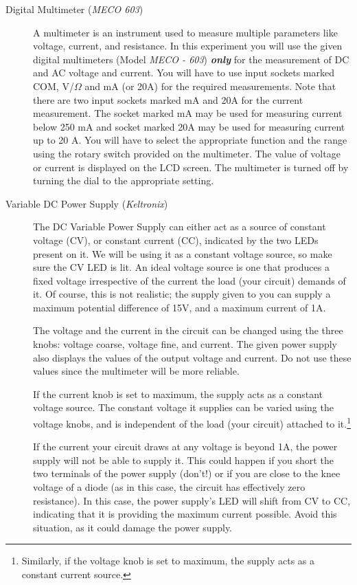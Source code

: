 \begin{description}
\item[Digital Multimeter (\textit{MECO 603})]

A multimeter is an instrument used to measure multiple parameters like voltage, current, and resistance. In this experiment you will use the given digital multimeters (Model \textit{MECO - 603}) \textbf{\textit{only}} for the measurement of DC and AC voltage and current. You will have to use input sockets marked COM, V/$\Omega$ and mA (or 20A) for the required measurements. Note that there are two input sockets marked mA and 20A for the current measurement. The socket marked mA may be used for measuring current below 250 mA and socket marked 20A may be used for measuring current up to 20 A. You will have to select the appropriate function and the range using the rotary switch provided on the multimeter. The value of voltage or current is displayed on the LCD screen. The multimeter is turned off by turning the dial to the appropriate setting.

\item[Variable DC Power Supply (\textit{Keltronix})]

The DC Variable Power Supply can either act as a source of constant voltage (CV), or constant current (CC), indicated by the two LEDs present on it. We will be using it as a constant voltage source, so make sure the CV LED is lit. An ideal voltage source is one that produces a fixed voltage irrespective of the current the load (your circuit) demands of it. Of course, this is not realistic; the supply given to you can supply a maximum potential difference of 15V, and a maximum current of 1A.

The voltage and the current in the circuit can be changed using the three knobs: voltage coarse, voltage fine, and current. The given power supply also displays the values of the output voltage and current. Do not use these values since the multimeter will be more reliable. 

If the current knob is set to maximum, the supply acts as a constant voltage source. The constant voltage it supplies can be varied using the voltage knobs, and is independent of the load (your circuit) attached to it.\footnote{Similarly, if the voltage knob is set to maximum, the supply acts as a constant current source.}

\begin{imp}
If the current your circuit draws at any voltage is beyond 1A, the power supply will not be able to supply it. This could happen if you short the two terminals of the power supply (don't!) or if you are close to the knee voltage of a diode (as in this case, the circuit has effectively zero resistance). In this case, the power supply's LED will shift from CV to CC, indicating that it is providing the maximum current possible. Avoid this situation, as it could damage the power supply.
\end{imp}


\end{description}
